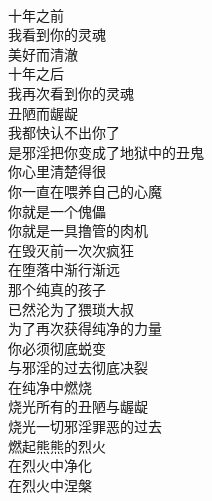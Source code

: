 \begin{poem}[在纯净中燃烧]
    \begin{multicols}{2}
        \centering~\\
        十年之前 \\ 我看到你的灵魂 \\ 美好而清澈 \\ 十年之后 \\ 我再次看到你的灵魂 \\ 丑陋而龌龊 \\ 我都快认不出你了 \\ 是邪淫把你变成了地狱中的丑鬼 \\ 你心里清楚得很 \\ 你一直在喂养自己的心魔 \\ 你就是一个傀儡 \\ 你就是一具撸管的肉机 \\ 在毁灭前一次次疯狂 \\ 在堕落中渐行渐远 \\ 那个纯真的孩子 \\ 已然沦为了猥琐大叔 \\ 为了再次获得纯净的力量 \\ 你必须彻底蜕变 \\ 与邪淫的过去彻底决裂 \\ 在纯净中燃烧 \\ 烧光所有的丑陋与龌龊 \\ 烧光一切邪淫罪恶的过去 \\ 燃起熊熊的烈火 \\ 在烈火中净化 \\ 在烈火中涅槃
    \end{multicols}
\end{poem}

